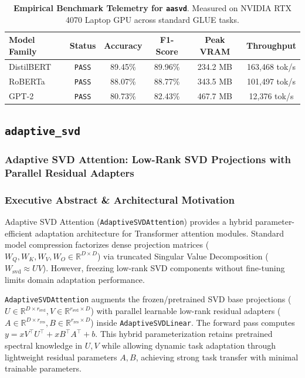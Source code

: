 \begin{table}[h]
\centering
\small
\caption{\textbf{Empirical Benchmark Telemetry for \texttt{aasvd}}. Measured on NVIDIA RTX 4070 Laptop GPU across standard GLUE tasks.}
\label{tab:telemetry_aasvd_compressions}
\begin{tabular*}{\columnwidth}{@{\extracolsep{\fill}}lccccc}
\toprule
\textbf{Model Family} & \textbf{Status} & \textbf{Accuracy} & \textbf{F1-Score} & \textbf{Peak VRAM} & \textbf{Throughput} \\
\midrule
DistilBERT & \texttt{PASS} & 89.45\% & 89.96\% & 234.2 MB & 163,468 tok/s \\
RoBERTa & \texttt{PASS} & 88.07\% & 88.77\% & 343.5 MB & 101,497 tok/s \\
GPT-2 & \texttt{PASS} & 80.73\% & 82.43\% & 467.7 MB & 12,376 tok/s \\
\bottomrule
\end{tabular*}
\end{table}

\subsection{\texttt{adaptive\_svd}}
\subsubsection*{Adaptive SVD Attention: Low-Rank SVD Projections with Parallel Residual Adapters}

\subsubsection*{Executive Abstract \& Architectural Motivation}

Adaptive SVD Attention (\texttt{AdaptiveSVDAttention}) provides a hybrid parameter-efficient adaptation architecture for Transformer attention modules. Standard model compression factorizes dense projection matrices ($W_Q, W_K, W_V, W_O \in \mathbb{R}^{D \times D}$) via truncated Singular Value Decomposition ($W_{\text{svd}} \approx U V$). However, freezing low-rank SVD components without fine-tuning limits domain adaptation performance.

\texttt{AdaptiveSVDAttention} augments the frozen/pretrained SVD base projections ($U \in \mathbb{R}^{D \times r_{\text{svd}}}, V \in \mathbb{R}^{r_{\text{svd}} \times D}$) with parallel learnable low-rank residual adapters ($A \in \mathbb{R}^{D \times r_{\text{res}}}, B \in \mathbb{R}^{r_{\text{res}} \times D}$) inside \texttt{AdaptiveSVDLinear}. The forward pass computes $y = x V^\top U^\top + x B^\top A^\top + b$. This hybrid parameterization retains pretrained spectral knowledge in $U, V$ while allowing dynamic task adaptation through lightweight residual parameters $A, B$, achieving strong task transfer with minimal trainable parameters.



